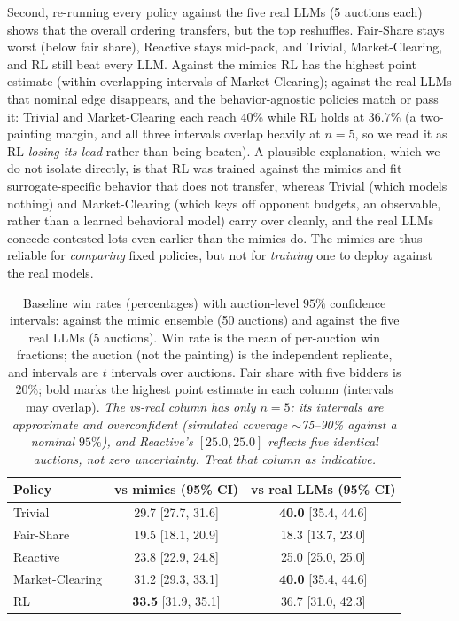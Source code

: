Second, re-running every policy against the five real LLMs (5 auctions each) shows that the overall ordering transfers, but the top reshuffles. Fair-Share stays worst (below fair share), Reactive stays mid-pack, and Trivial, Market-Clearing, and RL still beat every LLM. Against the mimics RL has the highest point estimate (within overlapping intervals of Market-Clearing); against the real LLMs that nominal edge disappears, and the behavior-agnostic policies match or pass it: Trivial and Market-Clearing each reach $40\%$ while RL holds at $36.7\%$ (a two-painting margin, and all three intervals overlap heavily at $n=5$, so we read it as RL \emph{losing its lead} rather than being beaten). A plausible explanation, which we do not isolate directly, is that RL was trained against the mimics and fit surrogate-specific behavior that does not transfer, whereas Trivial (which models nothing) and Market-Clearing (which keys off opponent budgets, an observable, rather than a learned behavioral model) carry over cleanly, and the real LLMs concede contested lots even earlier than the mimics do. The mimics are thus reliable for \emph{comparing} fixed policies, but not for \emph{training} one to deploy against the real models.

\begin{table}[htbp]
\caption{Baseline win rates (percentages) with auction-level $95\%$ confidence intervals: against the mimic ensemble (50 auctions) and against the five real LLMs (5 auctions). Win rate is the mean of per-auction win fractions; the auction (not the painting) is the independent replicate, and intervals are $t$ intervals over auctions. Fair share with five bidders is $20\%$; bold marks the highest point estimate in each column (intervals may overlap). \emph{The vs-real column has only $n=5$: its intervals are approximate and overconfident (simulated coverage $\sim$75--90\% against a nominal $95\%$), and Reactive's $[25.0,25.0]$ reflects five identical auctions, not zero uncertainty. Treat that column as indicative.}}
\label{tab:math_results}
\centering
\begin{tabular}{lcc}
\hline
Policy & vs mimics (95\% CI) & vs real LLMs (95\% CI) \\
\hline
Trivial          & 29.7 [27.7, 31.6] & \textbf{40.0} [35.4, 44.6] \\
Fair-Share       & 19.5 [18.1, 20.9] & 18.3 [13.7, 23.0] \\
Reactive         & 23.8 [22.9, 24.8] & 25.0 [25.0, 25.0] \\
Market-Clearing  & 31.2 [29.3, 33.1] & \textbf{40.0} [35.4, 44.6] \\
RL               & \textbf{33.5} [31.9, 35.1] & 36.7 [31.0, 42.3] \\
\hline
\end{tabular}
\end{table}


